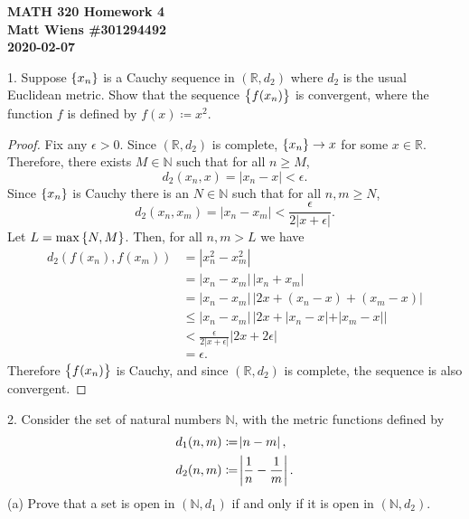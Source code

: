 \documentclass{article}
\newcommand{\N}{\mathbb{N}}
\newcommand{\R}{\mathbb{R}}
\begin{document}
\textbf{MATH 320 Homework 4} \\
\textbf{Matt Wiens \#301294492} \\
\textbf{2020-02-07}

1. Suppose $\cbr{x_n}$ is a Cauchy sequence in $(\R, d_2)$ where $d_2$ is
the usual Euclidean metric. Show that the sequence $\cbr{f(x_n)}$ is
convergent, where the function $f$ is defined by $f(x) \coloneqq x^2$.

\begin{proof}

Fix any $\epsilon > 0$. Since $(\R, d_2)$ is complete, $\cbr{x_n} \to x$
for some $x \in \R$. Therefore, there exists $M \in \N$ such that for
all $n \geq M$,
%
\begin{equation*}
    d_2(x_n, x) = |x_n - x| < \epsilon
    .
\end{equation*}
%
Since $\cbr{x_n}$ is Cauchy there is an $N \in \N$ such that for all $n,
m \geq N$,
%
\begin{equation*}
    d_2(x_n, x_m) = |x_n - x_m| < \frac{\epsilon}{2 |x + \epsilon|}
    .
\end{equation*}
%
Let $L = \max \cbr{N, M}$. Then, for all $n, m > L$ we have
%
\begin{align*}
    d_2(f(x_n), f(x_m))
        &= |x_n^2 - x_m^2| \\
        &= |x_n - x_m| \, |x_n + x_m| \\
        &= |x_n - x_m| \, |2x + (x_n - x) + (x_m - x)| \\
        &\leq |x_n - x_m| \, |2x + |x_n - x| + |x_m - x|| \\
        &< \frac{\epsilon}{2 |x + \epsilon|} |2x + 2\epsilon| \\
        &= \epsilon
        .
\end{align*}
%
Therefore $\cbr{f(x_n)}$ is Cauchy, and since $(\R, d_2)$ is complete,
the sequence is also convergent.

\end{proof}

\newpage

2. Consider the set of natural numbers $\N$, with the metric functions
defined by
%
\begin{align*}
    d_1(n, m) &\coloneqq \envert{n - m}, \\
    d_2(n, m) &\coloneqq \envert{\frac{1}{n} - \frac{1}{m}}.
\end{align*}
%
(a) Prove that a set is open in $(\N, d_1)$ if and only if it is open in
$(\N, d_2)$.
\end{document}
